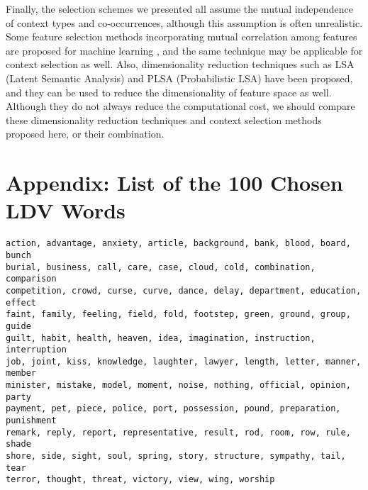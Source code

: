 \documentclass[english]{jnlp_1.4}
\begin{document}
Finally, the selection schemes we presented all assume the mutual
independence of context types and co-occurrences, although this
assumption is often unrealistic. Some feature selection methods
incorporating mutual correlation among features are proposed for
machine learning \cite{Ding:03}, and the same technique may be
applicable for context selection as well. Also, dimensionality
reduction techniques such as LSA (Latent Semantic Analysis)
\cite{Deerwester:90} and PLSA (Probabilistic LSA) \cite{Hofmann:01}
have been proposed, and they can be used to reduce the dimensionality
of feature space as well. Although they do not always reduce the
computational cost, we should compare these dimensionality reduction
techniques and context selection methods proposed here, or their
combination.


\section*{Appendix: List of the 100 Chosen LDV Words}

\begin{verbatim}
action, advantage, anxiety, article, background, bank, blood, board, bunch
burial, business, call, care, case, cloud, cold, combination, comparison
competition, crowd, curse, curve, dance, delay, department, education, effect
faint, family, feeling, field, fold, footstep, green, ground, group, guide
guilt, habit, health, heaven, idea, imagination, instruction, interruption
job, joint, kiss, knowledge, laughter, lawyer, length, letter, manner, member
minister, mistake, model, moment, noise, nothing, official, opinion, party
payment, pet, piece, police, port, possession, pound, preparation, punishment
remark, reply, report, representative, result, rod, room, row, rule, shade
shore, side, sight, soul, spring, story, structure, sympathy, tail, tear
terror, thought, threat, victory, view, wing, worship
\end{verbatim}
\end{document}
